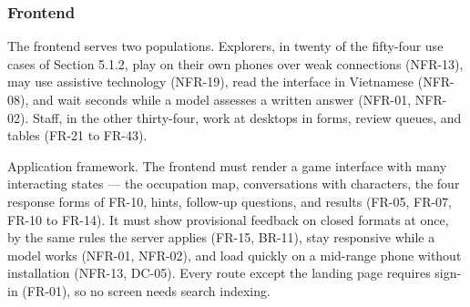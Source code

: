 \subsubsection{Frontend}

The frontend serves two populations. Explorers, in twenty of the fifty-four use cases of Section 5.1.2, play on their own phones over weak connections (NFR-13), may use assistive technology (NFR-19), read the interface in Vietnamese (NFR-08), and wait seconds while a model assesses a written answer (NFR-01, NFR-02). Staff, in the other thirty-four, work at desktops in forms, review queues, and tables (FR-21 to FR-43).

Application framework. The frontend must render a game interface with many interacting states --- the occupation map, conversations with characters, the four response forms of FR-10, hints, follow-up questions, and results (FR-05, FR-07, FR-10 to FR-14). It must show provisional feedback on closed formats at once, by the same rules the server applies (FR-15, BR-11), stay responsive while a model works (NFR-01, NFR-02), and load quickly on a mid-range phone without installation (NFR-13, DC-05). Every route except the landing page requires sign-in (FR-01), so no screen needs search indexing.

